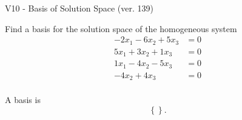 \begin{exercise}
  \begin{exerciseTitle}V10 - Basis of Solution Space (ver. 139)\end{exerciseTitle}
  \begin{exerciseStatement}
    Find a basis for the solution space of the homogeneous system 
\begin{align*}
 -2 x_ 1 -6 x_ 2 + 5 x_ 3 &= 0  \\ 
  5 x_ 1 + 3 x_ 2 + 1 x_ 3 &= 0  \\ 
  1 x_ 1 -4 x_ 2 -5 x_ 3 &= 0  \\ 
  -4 x_ 2 + 4 x_ 3 &= 0  \\ 
 \end{align*}


 
  \end{exerciseStatement}

  \begin{exerciseAnswer}
   A basis is   
\[\left\{\right\}.\]

  


  \end{exerciseAnswer}
\end{exercise}